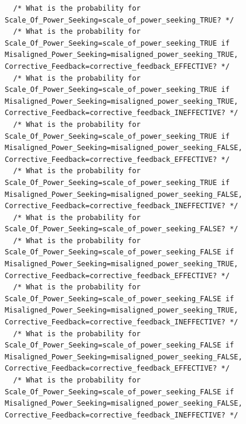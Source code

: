 \documentclass[
  11pt,
  letterpaper,
]{book}
\begin{document}
\begin{landscape}
\begin{verbatim}
  /* What is the probability for Scale_Of_Power_Seeking=scale_of_power_seeking_TRUE? */
  /* What is the probability for Scale_Of_Power_Seeking=scale_of_power_seeking_TRUE if Misaligned_Power_Seeking=misaligned_power_seeking_TRUE, Corrective_Feedback=corrective_feedback_EFFECTIVE? */
  /* What is the probability for Scale_Of_Power_Seeking=scale_of_power_seeking_TRUE if Misaligned_Power_Seeking=misaligned_power_seeking_TRUE, Corrective_Feedback=corrective_feedback_INEFFECTIVE? */
  /* What is the probability for Scale_Of_Power_Seeking=scale_of_power_seeking_TRUE if Misaligned_Power_Seeking=misaligned_power_seeking_FALSE, Corrective_Feedback=corrective_feedback_EFFECTIVE? */
  /* What is the probability for Scale_Of_Power_Seeking=scale_of_power_seeking_TRUE if Misaligned_Power_Seeking=misaligned_power_seeking_FALSE, Corrective_Feedback=corrective_feedback_INEFFECTIVE? */
  /* What is the probability for Scale_Of_Power_Seeking=scale_of_power_seeking_FALSE? */
  /* What is the probability for Scale_Of_Power_Seeking=scale_of_power_seeking_FALSE if Misaligned_Power_Seeking=misaligned_power_seeking_TRUE, Corrective_Feedback=corrective_feedback_EFFECTIVE? */
  /* What is the probability for Scale_Of_Power_Seeking=scale_of_power_seeking_FALSE if Misaligned_Power_Seeking=misaligned_power_seeking_TRUE, Corrective_Feedback=corrective_feedback_INEFFECTIVE? */
  /* What is the probability for Scale_Of_Power_Seeking=scale_of_power_seeking_FALSE if Misaligned_Power_Seeking=misaligned_power_seeking_FALSE, Corrective_Feedback=corrective_feedback_EFFECTIVE? */
  /* What is the probability for Scale_Of_Power_Seeking=scale_of_power_seeking_FALSE if Misaligned_Power_Seeking=misaligned_power_seeking_FALSE, Corrective_Feedback=corrective_feedback_INEFFECTIVE? */

\end{verbatim}
\end{landscape}
\end{document}
